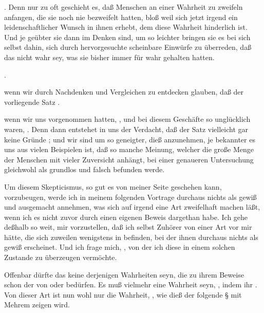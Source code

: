 \begin{aufza}[a)]
\item {}. Denn nur zu oft geschieht es, daß Menschen an einer Wahrheit zu zweifeln anfangen, die sie noch nie bezweifelt hatten, bloß weil sich jetzt irgend ein leidenschaftlicher Wunsch in ihnen erhebt, dem diese Wahrheit hinderlich ist. Und je geübter sie dann im Denken sind, um so leichter bringen sie es bei sich selbst dahin, sich durch hervorgesuchte scheinbare Einwürfe zu überreden, daß das nicht wahr sey, was sie bisher immer für wahr gehalten hatten.
\item {}.
\item wenn wir durch Nachdenken und Vergleichen zu entdecken glauben, daß der vorliegende Satz .
\item wenn wir uns vorgenommen hatten, , und bei diesem Geschäfte so unglücklich waren, . Denn dann entstehet in uns der Verdacht, daß der Satz vielleicht gar keine Gründe ; und wir sind um so geneigter, dieß anzunehmen, je bekannter es uns aus vielen Beispielen ist, daß so manche Meinung, welcher die große Menge der Menschen mit vieler Zuversicht anhängt, bei einer genaueren Untersuchung gleichwohl als grundlos und falsch befunden werde.
\end{aufza}\par
Um diesem Skepticismus, so gut es von meiner Seite geschehen kann, vorzubeugen, werde ich in meinem folgenden Vortrage durchaus nichts als gewiß und ausgemacht annehmen, was sich auf irgend eine Art zweifelhaft machen läßt, wenn ich es nicht zuvor durch einen eigenen Beweis dargethan habe. Ich gehe deßhalb so weit, mir vorzustellen, daß ich selbst Zuhörer von einer Art vor mir hätte, die sich zuweilen wenigstens in  befinden, bei der ihnen durchaus nichts als gewiß erscheinet. Und ich frage mich, , von der ich diese in einem solchen Zustande zu überzeugen vermöchte.\par
Offenbar dürfte das keine derjenigen Wahrheiten seyn, die zu ihrem Beweise schon der  von  oder  bedürfen. Es muß vielmehr eine Wahrheit seyn, , indem ihr . Von dieser Art ist nun wohl nur die Wahrheit, , wie dieß der folgende § mit Mehrem zeigen wird.

